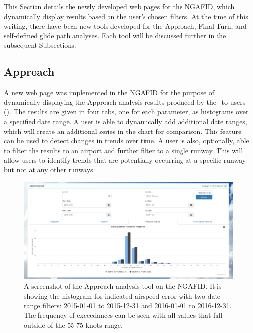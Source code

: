 	This Section details the newly developed web pages for the NGAFID, which dynamically display results based on the user's chosen filters.  At the time of this writing, there have been new tools developed for the Approach, Final Turn, and self-defined glide path analyses.  Each tool will be discussed further in the subsequent Subsections.
    
    
    \subsection{Approach}
    
    	A new web page was implemented in the NGAFID for the purpose of dynamically displaying the Approach analysis results produced by the \toolname\ to users ().  The results are given in four tabs, one for each parameter, as histograms over a specified date range.  A user is able to dynamically add additional date ranges, which will create an additional series in the chart for comparison.  This feature can be used to detect changes in trends over time.  A user is also, optionally, able to filter the results to an airport and further filter to a single runway.  This will allow users to identify trends that are potentially occurring at a specific runway but not at any other runways.
    
    	\begin{figure}
    		\centering
            \includegraphics[width=\linewidth]{img/approach_tool_screenshot}
            \caption{A screenshot of the Approach analysis tool on the NGAFID.  It is showing the histogram for indicated airspeed error with two date range filters: 2015-01-01 to 2015-12-31 and 2016-01-01 to 2016-12-31.  The frequency of exceedances can be seen with all values that fall outside of the 55-75 knots range.}
            \label{fig:approach_tool_screenshot}
    	\end{figure}
    
